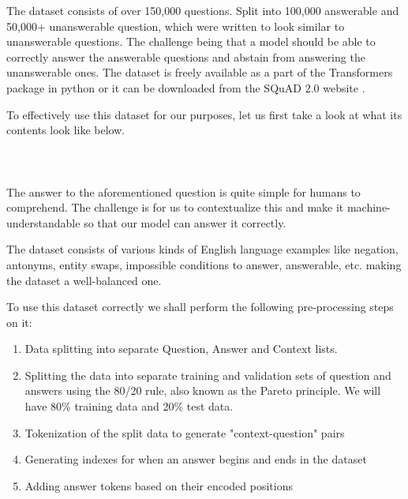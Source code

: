 \documentclass[12pt]{report}
\begin{document}
\begin{appendices}
        The dataset consists of over 150,000 questions. Split into 100,000 answerable and 50,000+ unanswerable question, which were written to look similar to unanswerable questions. The challenge being that a model should be able to correctly answer the answerable questions and abstain from answering the unanswerable ones.
        The dataset is freely available as a part of the Transformers package in python or it can be downloaded from the SQuAD 2.0 website \citep{squad}.

        To effectively use this dataset for our purposes, let us first take a look at what its contents look like below.\\ \\
        \noindent{}
        \\ \\

        The answer to the aforementioned question is quite simple for humans to comprehend. The challenge is for us to contextualize this and make it machine-understandable so that our model can answer it correctly.

        The dataset consists of various kinds of English language examples like negation, antonyms, entity swaps, impossible conditions to answer, answerable, etc. making the dataset a well-balanced one.

        To use this dataset correctly we shall perform the following pre-processing steps on it:

        \begin{enumerate}
            \item Data splitting into separate Question, Answer and Context lists.
            \item Splitting the data into separate training and validation sets of  question and answers using the 80/20 rule, also known as the Pareto principle. We will have 80\% training data and 20\% test data.
            \item Tokenization of the split data to generate "context-question" pairs
            \item Generating indexes for when an answer begins and ends in the dataset
            \item Adding answer tokens based on their encoded positions
        \end{enumerate}

\end{appendices}
\end{document}
